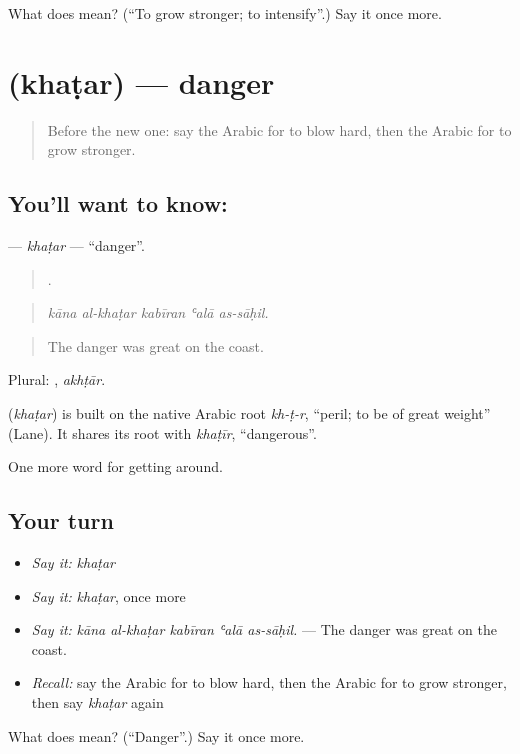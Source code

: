 \begin{tcolorbox}[breakable,colback=teal!4,colframe=teal!35!black,title={Before you move on}]
What does  mean? (\textquotedblleft{}To grow stronger; to intensify\textquotedblright{}.) Say it once more.
\end{tcolorbox}
\section[\texorpdfstring{\ar{خطر} (khaṭar)}{خطر (khaṭar)}]{ (khaṭar) — danger}

\label{lesson:AR-C482-khatar}



\begin{quote}
Before the new one: say the Arabic for to blow hard, then the Arabic for to grow stronger.
\end{quote}

\subsection*{You'll want to know: }
\textbf{} — \emph{khaṭar} — \textquotedblleft{}danger\textquotedblright{}.

\begin{quote}
    .
\end{quote}

\begin{quote}
\emph{kāna al-khaṭar kabīran ʿalā as-sāḥil.}
\end{quote}

\begin{quote}
The danger was great on the coast.
\end{quote}

Plural: , \emph{akhṭār}.

\begin{cousinweb}
\textbf{} (\emph{khaṭar}) is built on the native Arabic root \emph{kh-ṭ-r}, \textquotedblleft{}peril; to be of great weight\textquotedblright{} (Lane). It shares its root with \emph{khaṭīr}, \textquotedblleft{}dangerous\textquotedblright{}.
\end{cousinweb}

\begin{grammarlens}[title={What you've built}]
One more word for getting around.
\end{grammarlens}

\subsection*{Your turn}
\begin{itemize}
\raggedright
  \item \emph{Say it:} \emph{khaṭar}
  \item \emph{Say it:} \emph{khaṭar}, once more
  \item \emph{Say it:} \emph{kāna al-khaṭar kabīran ʿalā as-sāḥil.} — The danger was great on the coast.
  \item \emph{Recall:} say the Arabic for to blow hard, then the Arabic for to grow stronger, then say \emph{khaṭar} again
\end{itemize}

\begin{tcolorbox}[breakable,colback=teal!4,colframe=teal!35!black,title={Before you move on}]
What does  mean? (\textquotedblleft{}Danger\textquotedblright{}.) Say it once more.
\end{tcolorbox}

